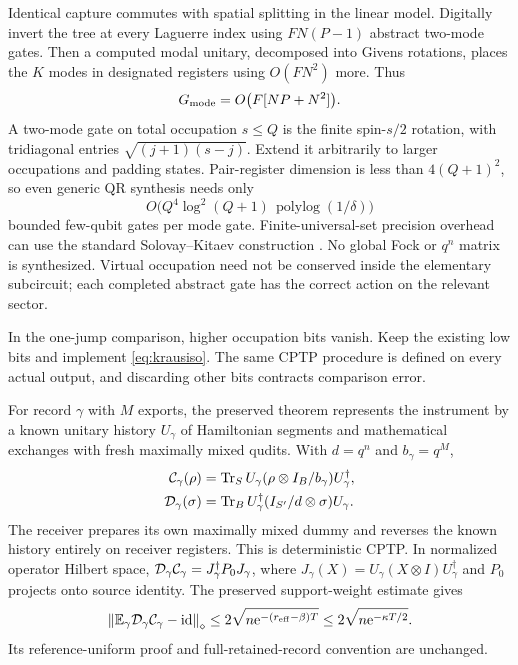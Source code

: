 \documentclass[11pt,a4paper]{article}
\newcommand{\id}{\operatorname{id}}\newcommand{\Tr}{\operatorname{Tr}}\newcommand{\osc}{\operatorname{osc}}
\newcommand{\norm}[1]{\left\lVert #1\right\rVert}\newcommand{\ket}[1]{\lvert #1\rangle}\newcommand{\bra}[1]{\langle #1\rvert}
\newcommand{\ee}{\mathrm e}
\begin{document}
Identical capture commutes with spatial splitting in the linear model. Digitally invert the tree at every Laguerre index using $FN(P-1)$ abstract two-mode gates. Then a computed modal unitary, decomposed into Givens rotations, places the $K$ modes in designated registers using $O(FN^2)$ more. Thus
\begin{equation}
 G_{\rm mode}=O\bigl(F[NP+N^2]\bigr).
\end{equation}
A two-mode gate on total occupation $s\le Q$ is the finite spin-$s/2$ rotation, with tridiagonal entries $\sqrt{(j+1)(s-j)}$. Extend it arbitrarily to larger occupations and padding states. Pair-register dimension is less than $4(Q+1)^2$, so even generic QR synthesis needs only
\begin{equation}
 O\bigl(Q^4\log^2(Q+1)\,\operatorname{polylog}(1/\delta)\bigr)
 \label{eq:paircost}
\end{equation}
bounded few-qubit gates per mode gate. Finite-universal-set precision overhead can use the standard Solovay--Kitaev construction \cite{dawson}. No global Fock or $q^n$ matrix is synthesized. Virtual occupation need not be conserved inside the elementary subcircuit; each completed abstract gate has the correct action on the relevant sector.

In the one-jump comparison, higher occupation bits vanish. Keep the existing low bits and implement \eqref{eq:krausiso}. The same CPTP procedure is defined on every actual output, and discarding other bits contracts comparison error.

For record $\gamma$ with $M$ exports, the preserved theorem represents the instrument by a known unitary history $U_\gamma$ of Hamiltonian segments and mathematical exchanges with fresh maximally mixed qudits. With $d=q^n$ and $b_\gamma=q^M$,
\begin{align}
 \cC_\gamma(\rho)&=\Tr_S U_\gamma(\rho\otimes I_B/b_\gamma)U_\gamma^\dagger,\\
 \cD_\gamma(\sigma)&=\Tr_B U_\gamma^\dagger(I_{S'}/d\otimes\sigma)U_\gamma.
 \label{eq:reverse}
\end{align}
The receiver prepares its own maximally mixed dummy and reverses the known history entirely on receiver registers. This is deterministic CPTP. In normalized operator Hilbert space, $\mathcal D_\gamma\mathcal C_\gamma=J_\gamma^\dagger P_0J_\gamma$, where $J_\gamma(X)=U_\gamma(X\otimes I)U_\gamma^\dagger$ and $P_0$ projects onto source identity. The preserved support-weight estimate gives
\begin{equation}
 \norm{\mathbb E_\gamma\cD_\gamma\cC_\gamma-\id}_\diamond
 \le2\sqrt{n\ee^{-(r_{\rm eff}-\beta)T}}
 \le2\sqrt{n\ee^{-\kappa T/2}}.
 \label{eq:reverseerror}
\end{equation}
Its reference-uniform proof and full-retained-record convention are unchanged.
\end{document}
